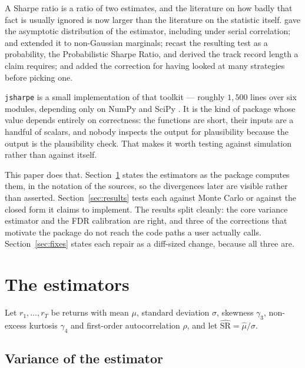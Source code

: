 \documentclass[11pt,a4paper]{article}
\newcommand{\code}[1]{\texttt{#1}}
\newcommand{\SR}{\mathrm{SR}}
\begin{document}
A Sharpe ratio \citep{sharpe1966,sharpe1994} is a ratio of two estimates, and
the literature on how badly that fact is usually ignored is now larger than
the literature on the statistic itself. \citet{lo2002} gave the asymptotic
distribution of the estimator, including under serial correlation;
\citet{mertens2002} and \citet{opdyke2007} extended it to non-Gaussian
marginals; \citet{bailey2012} recast the resulting test as a probability, the
Probabilistic Sharpe Ratio, and derived the track record length a claim
requires; \citet{bailey2014} and \citet{harvey2015} added the correction for
having looked at many strategies before picking one.

\code{jsharpe} is a small implementation of that toolkit --- roughly $1{,}500$
lines over six modules, depending only on NumPy \citep{harris2020} and SciPy
\citep{virtanen2020}. It is the kind of package whose value depends entirely on
correctness: the functions are short, their inputs are a handful of scalars,
and nobody inspects the output for plausibility because the output is the
plausibility check. That makes it worth testing against simulation rather than
against itself.

This paper does that. Section~\ref{sec:method} states the estimators as the
package computes them, in the notation of the sources, so the divergences later
are visible rather than asserted. Section~\ref{sec:results} tests each against
Monte Carlo or against the closed form it claims to implement. The results
split cleanly: the core variance estimator and the FDR calibration are right,
and three of the corrections that motivate the package do not reach the code
paths a user actually calls. Section~\ref{sec:fixes} states each repair as a
diff-sized change, because all three are.

\section{The estimators}
\label{sec:method}

Let $r_1, \ldots, r_T$ be returns with mean $\mu$, standard deviation $\sigma$,
skewness $\gamma_3$, non-excess kurtosis $\gamma_4$ and first-order
autocorrelation $\rho$, and let $\widehat{\SR} = \hat\mu / \hat\sigma$.

\subsection{Variance of the estimator}
\end{document}
